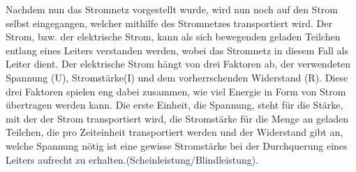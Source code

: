 Nachdem nun das Stromnetz vorgestellt wurde, wird nun noch auf den Strom selbst eingegangen, welcher mithilfe des Stromnetzes transportiert wird. Der Strom, bzw. der elektrische Strom, kann als sich bewegenden geladen Teilchen entlang eines Leiters verstanden werden, wobei das Stromnetz in diesem Fall als Leiter dient. Der elektrische Strom hängt von drei Faktoren ab, der verwendeten Spannung (U), Stromstärke(I) und dem vorherrschenden Widerstand (R). Diese drei Faktoren spielen eng dabei zusammen, wie viel Energie in Form von Strom übertragen werden kann. Die erste Einheit, die Spannung, steht für die Stärke, mit der der Strom transportiert wird, die Stromstärke für die Menge an geladen Teilchen, die pro Zeiteinheit transportiert werden und der Widerstand gibt an, welche Spannung nötig ist eine gewisse Stromstärke bei der Durchquerung eines Leiters aufrecht zu erhalten.(Scheinleistung/Blindleistung). \cite{widerstand_1} \cite{spannung_1} \cite{stromstaerke_1}

